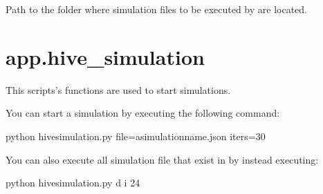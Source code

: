 \documentclass[letterpaper,10pt,english]{sphinxmanual}
\begin{document}

\begin{fulllineitems}
\label{\detokenize{app:app.environment_settings.SIMULATION_ROOT}}
Path to the folder where simulation files to be executed by
{\hyperref[\detokenize{app:module-app.hive_simulation}]{}} are located.

\end{fulllineitems}



\section{app.hive\_simulation}
\label{\detokenize{app:module-app.hive_simulation}}\label{\detokenize{app:app-hive-simulation}}
This scripts’s functions are used to start simulations.

You can start a simulation by executing the following command:

\begin{sphinxVerbatim}[commandchars=\\\{\}]
\PYGZdl{} python hive\PYGZus{}simulation.py \PYGZhy{}\PYGZhy{}file=a\PYGZus{}simulation\PYGZus{}name.json \PYGZhy{}\PYGZhy{}iters=30
\end{sphinxVerbatim}

You can also execute all simulation file that exist in
{\hyperref[\detokenize{app:app.environment_settings.SIMULATION_ROOT}]{}} by instead executing:

\begin{sphinxVerbatim}[commandchars=\\\{\}]
\PYGZdl{} python hive\PYGZus{}simulation.py \PYGZhy{}d \PYGZhy{}i 24
\end{sphinxVerbatim}
\end{document}
